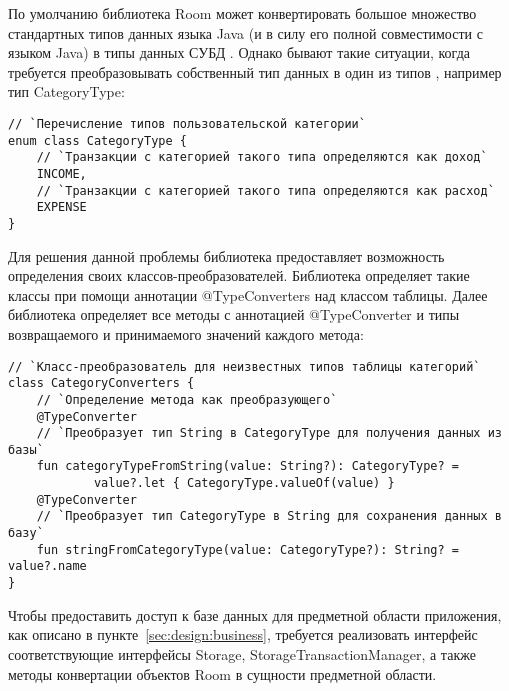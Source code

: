 По умолчанию библиотека Room может конвертировать большое множество стандартных типов данных языка Java (и \kt в силу его полной совместимости с языком Java) в типы данных СУБД \sqlite.
Однако бывают такие ситуации, когда требуется преобразовывать собственный тип данных в один из типов \sqlite, например тип CategoryType:
\begin{lstlisting}[style=standard]
// `Перечисление типов пользовательской категории`
enum class CategoryType {
    // `Транзакции с категорией такого типа определяются как доход`
    INCOME,
    // `Транзакции с категорией такого типа определяются как расход`
    EXPENSE
}
\end{lstlisting}

Для решения данной проблемы библиотека предоставляет возможность определения своих классов-преобразователей.
Библиотека определяет такие классы при помощи аннотации @TypeConverters над классом таблицы.
Далее библиотека определяет все методы с аннотацией @TypeConverter и типы возвращаемого и принимаемого значений каждого метода:
\begin{lstlisting}[style=standard]
// `Класс-преобразователь для неизвестных типов таблицы категорий`
class CategoryConverters {
    // `Определение метода как преобразующего`
    @TypeConverter
    // `Преобразует тип String в CategoryType для получения данных из базы`
    fun categoryTypeFromString(value: String?): CategoryType? =
            value?.let { CategoryType.valueOf(value) }
    @TypeConverter
    // `Преобразует тип CategoryType в String для сохранения данных в базу`
    fun stringFromCategoryType(value: CategoryType?): String? = value?.name
}
\end{lstlisting}

Чтобы предоставить доступ к базе данных для предметной области приложения, как описано в пункте~\ref{sec:design:business}, требуется реализовать интерфейс соответствующие интерфейсы Storage, StorageTransactionManager, а также методы конвертации объектов Room в сущности предметной области.